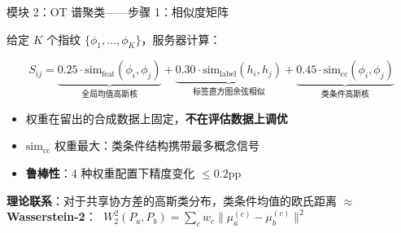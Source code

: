 \documentclass[aspectratio=169,11pt]{ctexbeamer}
\begin{document}
\begin{frame}{模块 2：OT 谱聚类——步骤 1：相似度矩阵}

给定 $K$ 个指纹 $\{\phi_1, \ldots, \phi_K\}$，服务器计算：

\begin{equation*}
S_{ij} = \underbrace{0.25 \cdot \mathrm{sim}_{\mathrm{feat}}(\phi_i, \phi_j)}_{\text{全局均值高斯核}}
       + \underbrace{0.30 \cdot \mathrm{sim}_{\mathrm{label}}(h_i, h_j)}_{\text{标签直方图余弦相似}}
       + \underbrace{0.45 \cdot \mathrm{sim}_{\mathrm{cc}}(\phi_i, \phi_j)}_{\text{类条件高斯核}}
\end{equation*}

\vspace{4pt}
\begin{itemize}\setlength\itemsep{2pt}
  \item 权重在留出的合成数据上固定，\textbf{不在评估数据上调优}
  \item $\mathrm{sim}_{\mathrm{cc}}$ 权重最大：类条件结构携带最多概念信号
  \item \textbf{鲁棒性}：4 种权重配置下精度变化 $\leq 0.2$pp
\end{itemize}

\vspace{4pt}
\textbf{理论联系}：对于共享协方差的高斯类分布，类条件均值的欧氏距离 $\approx$ \textbf{Wasserstein-2}：
$\;W_2^2(P_a, P_b) = \sum_c w_c \|\mu_a^{(c)} - \mu_b^{(c)}\|^2$
\end{frame}
\end{document}
